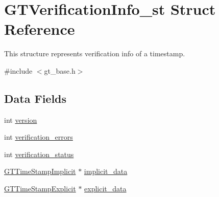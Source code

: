 \hypertarget{struct_g_t_verification_info__st}{
\section{GTVerificationInfo\_\-st Struct Reference}
\label{struct_g_t_verification_info__st}
}


This structure represents verification info of a timestamp.  




{\ttfamily \#include $<$gt\_\-base.h$>$}

\subsection*{Data Fields}
\begin{DoxyCompactItemize}
\item 
int \hyperlink{struct_g_t_verification_info__st_a74ada58f129d43790cf81e023ce1ae71}{version}
\item 
int \hyperlink{struct_g_t_verification_info__st_aeb572fb192cf7e67a573d8fbd924a3dd}{verification\_\-errors}
\item 
int \hyperlink{struct_g_t_verification_info__st_a9c1f6171361e1bd9b4c19b9d7152dd0c}{verification\_\-status}
\item 
\hyperlink{struct_g_t_time_stamp_implicit__st}{GTTimeStampImplicit} $\ast$ \hyperlink{struct_g_t_verification_info__st_a88ab8f11b10eef254f0a2b7fcec13c40}{implicit\_\-data}
\item 
\hyperlink{struct_g_t_time_stamp_explicit__st}{GTTimeStampExplicit} $\ast$ \hyperlink{struct_g_t_verification_info__st_ac01008ee2f1698ba06125490912c8eac}{explicit\_\-data}
\end{DoxyCompactItemize}


